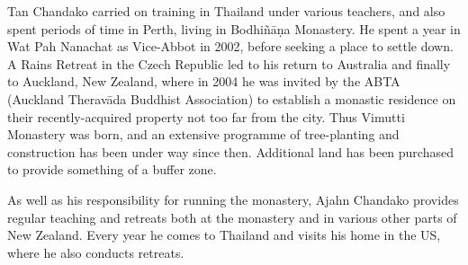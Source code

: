Tan Chandako carried on training in Thailand under various
teachers, and also spent periods of time in Perth, living in Bodhiñāṇa
Monastery. He spent a year in Wat Pah Nanachat as Vice-Abbot in 2002, 
before seeking a place to settle down. A Rains Retreat in the Czech
Republic led to his return to Australia and finally to Auckland, New
Zealand, where in 2004 he was invited by the ABTA (Auckland Theravāda 
Buddhist Association) to establish a monastic residence on their
recently-acquired property not too far from the city. Thus Vimutti
Monastery was born, and an extensive programme of tree-planting and
construction has been under way since then. Additional land has been
purchased to provide something of a buffer zone.

As well as his responsibility for running the monastery, Ajahn Chandako
provides regular teaching and retreats both at the monastery and in
various other parts of New Zealand. Every year he comes to Thailand and
visits his home in the US, where he also conducts retreats. 

